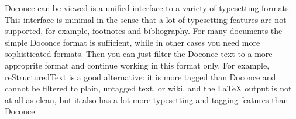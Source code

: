 \documentclass[a4paper,english]{article}
\begin{document}
Doconce can be viewed is a unified interface to a variety of
typesetting formats.  This interface is minimal in the sense that a
lot of typesetting features are not supported, for example, footnotes
and bibliography. For many documents the simple Doconce format is
sufficient, while in other cases you need more sophisticated
formats. Then you can just filter the Doconce text to a more
approprite format and continue working in this format only.  For
example, reStructuredText is a good alternative: it is more tagged
than Doconce and cannot be filtered to plain, untagged text, or wiki,
and the LaTeX output is not at all as clean, but it also has a lot
more typesetting and tagging features than Doconce.
\end{document}
